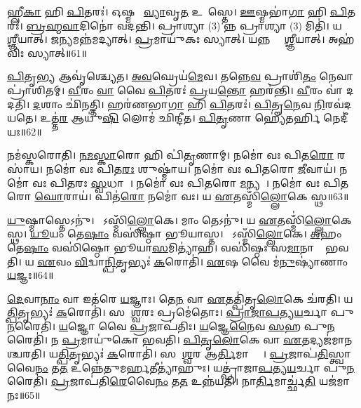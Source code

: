 𑌹𑍍𑌲𑍀\ul{𑌕𑌾} 𑌹𑌿 \ul{𑌪𑌿}𑌤𑌰𑌃॑।
𑌓𑌷𑍍𑌮𑌣𑍋᳚ \ul{𑌵𑍍𑌯𑌾}𑌵𑍃\ul{𑌤} 𑌉𑌪𑌾᳚𑌸𑍍𑌤𑍇।
\ul{𑌊}𑌷𑍍𑌮𑌭𑌾॑\ul{𑌗𑌾} 𑌹𑌿 \ul{𑌪𑌿}𑌤𑌰𑌃॑।
\ul{𑌬𑍍𑌰}\ul{𑌹𑍍𑌮}\ul{𑌵𑌾}𑌦𑌿𑌨𑍋॑ 𑌵𑌦𑌨𑍍𑌤𑌿।
𑌪𑍍𑌰𑌾𑌶𑍍𑌯𑌾 (3) 𑌨𑍍𑌨 𑌪𑍍𑌰𑌾𑌶𑍍𑌯𑌾 (3) 𑌮𑌿𑌤𑌿॑।
𑌯𑌤𑍍𑌪𑍍𑌰𑌾᳚\ul{𑌶𑍍𑌞𑍀}𑌯𑌾𑌤𑍍।
𑌜\ul{𑌨𑍍𑌯}𑌮𑌨𑍍𑌨॑𑌮𑌦𑍍𑌯𑌾𑌤𑍍।
\ul{𑌪𑍍𑌰}𑌮𑌾𑌯𑍁॑𑌕𑌃 𑌸𑍍𑌯𑌾𑌤𑍍।
𑌯𑌨𑍍𑌨 𑌪𑍍𑌰𑌾᳚\ul{𑌶𑍍𑌞𑍀}𑌯𑌾𑌤𑍍।
𑌅𑌹॑𑌵𑌿𑌃 𑌸𑍍𑌯𑌾𑌤𑍍॥61॥

\ul{𑌪𑌿}𑌤𑍃\ul{𑌭𑍍𑌯} 𑌆𑌵𑍃॑𑌶𑍍𑌚𑍍𑌯𑍇𑌤।
\ul{𑌅}\ul{𑌵}𑌘𑍍𑌰𑍇𑌯॑\ul{𑌮𑍇}𑌵।
𑌤𑌨𑍍𑌨𑍇\ul{𑌵} 𑌪𑍍𑌰𑌾𑌶𑌿॑\ul{𑌤𑌂} 𑌨𑍇𑌵𑌾𑌪𑍍𑌰𑌾॑𑌶𑌿𑌤𑌮𑍍।
\ul{𑌵𑍀}𑌰𑌂 \ul{𑌵𑌾} 𑌵𑍈 \ul{𑌪𑌿}𑌤𑌰𑌃॑ \ul{𑌪𑍍𑌰}𑌯\ul{𑌨𑍍𑌤𑍋} 𑌹𑌰॑𑌨𑍍𑌤𑌿।
\ul{𑌵𑍀}𑌰𑌂 𑌵𑌾॑ 𑌦𑌦𑌤𑌿।
\ul{𑌦}𑌶𑌾𑌂 𑌛𑌿॑𑌨𑌤𑍍𑌤𑌿।
𑌹𑌰॑𑌣𑌭𑌾\ul{𑌗𑌾} 𑌹𑌿 \ul{𑌪𑌿}𑌤𑌰𑌃॑।
\ul{𑌪𑌿}𑌤𑍄\ul{𑌨𑍇}𑌵 \ul{𑌨𑌿}𑌰𑌵॑𑌦𑌯𑌤𑍇।
𑌉𑌤𑍍𑌤॑\ul{𑌰} 𑌆𑌯𑍁॑\ul{𑌷𑌿} 𑌲𑍋𑌮॑ 𑌛𑌿𑌨𑍍𑌦𑍀𑌤।
\ul{𑌪𑌿}\ul{𑌤𑍃}𑌣𑌾 𑌹𑍍𑌯𑍇॑𑌤𑌰𑍍\mbox{}\ul{𑌹𑌿} 𑌨𑍇𑌦𑍀॑𑌯𑌃॥62॥

𑌨𑌮॑𑌸𑍍𑌕𑌰𑍋𑌤𑌿।
\ul{𑌨}\ul{𑌮}\ul{𑌸𑍍𑌕𑌾}𑌰𑍋 𑌹𑌿 𑌪𑌿॑\ul{𑌤𑍃}𑌣𑌾𑌮𑍍।
𑌨𑌮𑍋॑ 𑌵𑌃 𑌪𑌿𑌤\ul{𑌰𑍋} 𑌰𑌸𑌾॑𑌯।
𑌨𑌮𑍋॑ 𑌵𑌃 𑌪𑌿𑌤\ul{𑌰𑌃} 𑌶𑍁𑌷𑍍𑌮𑌾॑𑌯।
𑌨𑌮𑍋॑ 𑌵𑌃 𑌪𑌿𑌤𑌰𑍋 \ul{𑌜𑍀}𑌵𑌾𑌯॑।
𑌨𑌮𑍋॑ 𑌵𑌃 𑌪𑌿𑌤𑌰𑌃 \ul{𑌸𑍍𑌵}𑌧𑌾𑌯𑍈᳚।
𑌨𑌮𑍋॑ 𑌵𑌃 𑌪𑌿𑌤𑌰𑍋 \ul{𑌮}𑌨𑍍𑌯𑌵𑍇᳚।
𑌨𑌮𑍋॑ 𑌵𑌃 𑌪𑌿𑌤𑌰𑍋 \ul{𑌘𑍋}𑌰𑌾𑌯॑।
𑌪𑌿𑌤॑\ul{𑌰𑍋} 𑌨𑌮𑍋॑ 𑌵𑌃।
𑌯 \ul{𑌏}𑌤𑌸𑍍𑌮𑌿𑌁॑\ul{𑌲𑍍𑌲𑍋}𑌕𑍇 𑌸𑍍𑌥॥63॥

\ul{𑌯𑍁}𑌷𑍍𑌮𑌾𑌸𑍍𑌤𑍇𑌽𑌨𑍁॑।
𑌯𑍇᳚𑌽𑌸𑍍𑌮𑌿𑌁\ul{𑌲𑍍𑌲𑍋}𑌕𑍇।
𑌮𑌾𑌂 𑌤𑍇𑌽𑌨𑍁॑।
𑌯 \ul{𑌏}𑌤𑌸𑍍𑌮𑌿𑌁॑\ul{𑌲𑍍𑌲𑍋}𑌕𑍇 𑌸𑍍𑌥।
\ul{𑌯𑍂}𑌯𑌂 𑌤𑍇\ul{𑌷𑌾𑌂} 𑌵𑌸𑌿॑𑌷𑍍𑌠𑌾 𑌭𑍂𑌯𑌾𑌸𑍍𑌤।
𑌯𑍇᳚𑌽𑌸𑍍𑌮𑌿𑌁\ul{𑌲𑍍𑌲𑍋}𑌕𑍇।
\ul{𑌅}𑌹𑌂 𑌤𑍇\ul{𑌷𑌾𑌂} 𑌵𑌸𑌿॑𑌷𑍍𑌠𑍋 𑌭𑍂𑌯𑌾\ul{𑌸}𑌮𑌿𑌤𑍍𑌯𑌾॑𑌹।
𑌵𑌸𑌿॑𑌷𑍍𑌠𑌃 𑌸\ul{𑌮𑌾}𑌨𑌾𑌨𑌾𑌂᳚ 𑌭𑌵𑌤𑌿।
𑌯 \ul{𑌏}𑌵𑌂 \ul{𑌵𑌿}𑌦𑍍𑌵𑌾\ul{𑌨𑍍𑌪𑌿}𑌤𑍃𑌭𑍍𑌯𑌃॑ \ul{𑌕}𑌰𑍋𑌤𑌿॑।
\ul{𑌏}𑌷 𑌵𑍈 𑌮॑\ul{𑌨𑍁}𑌷𑍍𑌯𑌾॑𑌣𑌾𑌂 \ul{𑌯}𑌜𑍍𑌞𑌃॥64॥

\ul{𑌦𑍇}𑌵𑌾\ul{𑌨𑌾𑌂} 𑌵𑌾 𑌇𑌤॑𑌰𑍇 \ul{𑌯}𑌜𑍍𑌞𑌾𑌃।
𑌤𑍇\ul{𑌨} 𑌵𑌾 \ul{𑌏}𑌤𑌤𑍍𑌪𑌿॑𑌤𑍃\ul{𑌲𑍋}𑌕𑍇 𑌚॑𑌰𑌤𑌿।
𑌯\ul{𑌤𑍍𑌪𑌿}𑌤𑍃𑌭𑍍𑌯𑌃॑ \ul{𑌕}𑌰𑍋𑌤𑌿॑।
𑌸 𑌈᳚\ul{𑌶𑍍𑌵}𑌰𑌃 𑌪𑍍𑌰𑌮𑍇॑𑌤𑍋𑌃।
\ul{𑌪𑍍𑌰𑌾}\ul{𑌜𑌾}\ul{𑌪}𑌤𑍍𑌯\ul{𑌯}𑌰𑍍𑌚𑌾 𑌪𑍁\ul{𑌨}𑌰𑍈𑌤𑌿॑।
\ul{𑌯}𑌜𑍍𑌞𑍋 𑌵𑍈 \ul{𑌪𑍍𑌰}𑌜𑌾𑌪॑𑌤𑌿𑌃।
\ul{𑌯}𑌜𑍍𑌞𑍇\ul{𑌨𑍈}𑌵 \ul{𑌸}𑌹 𑌪𑍁\ul{𑌨}𑌰𑍈𑌤𑌿॑।
𑌨 \ul{𑌪𑍍𑌰}𑌮𑌾𑌯𑍁॑𑌕𑍋 𑌭𑌵𑌤𑌿।
\ul{𑌪𑌿}\ul{𑌤𑍃}\ul{𑌲𑍋}𑌕𑍇 𑌵𑌾 \ul{𑌏}𑌤𑌦𑍍𑌯𑌜॑𑌮𑌾𑌨𑌶𑍍𑌚𑌰𑌤𑌿।
𑌯\ul{𑌤𑍍𑌪𑌿}𑌤𑍃𑌭𑍍𑌯𑌃॑ \ul{𑌕}𑌰𑍋𑌤𑌿॑।
𑌸 𑌈᳚\ul{𑌶𑍍𑌵}𑌰 𑌆\ul{𑌰𑍍𑌤𑌿}𑌮𑌾𑌰𑍍𑌤𑍋𑌃᳚।
\ul{𑌪𑍍𑌰}𑌜𑌾𑌪॑\ul{𑌤𑌿}𑌸𑍍𑌤𑍍𑌵𑌾𑌵𑍈\ul{𑌨𑌂} 𑌤\ul{𑌤} 𑌉𑌨𑍍𑌨𑍇॑𑌤𑍁𑌮𑌰𑍍\mbox{}\ul{𑌹}𑌤𑍀𑌤𑍍𑌯𑌾॑𑌹𑍁𑌃।
𑌯𑌤𑍍𑌪𑍍𑌰𑌾॑𑌜𑌾\ul{𑌪}𑌤𑍍𑌯\ul{𑌯}𑌰𑍍𑌚𑌾 𑌪𑍁\ul{𑌨}𑌰𑍈𑌤𑌿॑।
\ul{𑌪𑍍𑌰}𑌜𑌾𑌪॑𑌤𑌿\ul{𑌰𑍇}𑌵𑍈\ul{𑌨𑌂} 𑌤\ul{𑌤} 𑌉𑌨𑍍𑌨॑𑌯𑌤𑌿।
𑌨𑌾\ul{𑌰𑍍𑌤𑌿}𑌮𑌾𑌰𑍍𑌚𑍍𑌛॑\ul{𑌤𑌿} 𑌯𑌜॑𑌮𑌾𑌨𑌃॥65॥\anuvakamend[𑌇𑌤𑍍𑌯॑𑌶𑍍𑌞𑍁𑌤𑍇 𑌪𑌦𑍍𑌯𑌨𑍍𑌤𑍇 𑌪𑌦𑍍𑌯\ul{𑌨𑍍𑌤𑍇} 𑌷𑌡𑍍𑌵𑌾 \ul{𑌋}𑌤𑌵𑍋॑ 𑌵\ul{𑌰𑍍𑌤}𑌤𑍇\-𑌽𑌹॑𑌵𑌿𑌃 \ul{𑌸𑍍𑌯𑌾}𑌨𑍍𑌨𑍇𑌦𑍀॑\ul{𑌯𑌃} 𑌸𑍍𑌥 \ul{𑌯}𑌜𑍍𑌞𑍋 𑌯𑌜॑𑌮𑌾𑌨𑌶𑍍𑌚𑌰\ul{𑌤𑌿} 𑌯\ul{𑌤𑍍𑌪𑌿}𑌤𑍃𑌭𑍍𑌯𑌃॑ \ul{𑌕}𑌰𑍋\ul{𑌤𑌿} 𑌪𑌞𑍍𑌚॑ 𑌚]




\clearpage
{}
\setcounter{anuvakam}{0}

